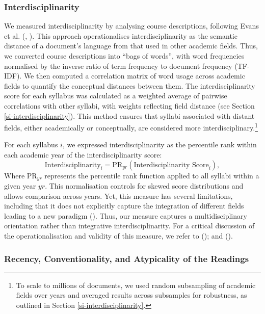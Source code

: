 \documentclass[
  british,
  12pt,
]{article}
\begin{document}
\subsubsection{Interdisciplinarity}\label{interdisciplinarity}

We measured interdisciplinarity by analysing course descriptions, following Evans et al. (, ). This approach operationalises interdisciplinarity as the semantic distance of a document's language from that used in other academic fields. Thus, we converted course descriptions into ``bags of words'', with word frequencies normalised by the inverse ratio of term frequency to document frequency (TF-IDF). We then computed a correlation matrix of word usage across academic fields to quantify the conceptual distances between them. The interdisciplinarity score for each syllabus was calculated as a weighted average of pairwise correlations with other syllabi, with weights reflecting field distance (see Section \ref{si-interdisciplinarity}). This method ensures that syllabi associated with distant fields, either academically or conceptually, are considered more interdisciplinary.\footnote{
  To scale to millions of documents, we used random subsampling of academic fields over years and averaged results across subsamples for robustness, as outlined in Section \ref{si-interdisciplinarity}.}

For each syllabus \(i\), we expressed interdisciplinarity as the percentile rank within each academic year of the interdisciplinarity score:
\[
  \text{Interdisciplinarity}_i = 
  \text{PR}_{yr} (\text{Interdisciplinarity Score}_i),
\]
Where \(\text{PR}_{yr}\) represents the percentile rank function applied to all syllabi within a given year \(yr\). This normalisation controls for skewed score distributions and allows comparison across years.
Yet, this measure has several limitations, including that it does not explicitly capture the integration of different fields leading to a new paradigm (). Thus, our measure captures a multidisciplinary orientation rather than integrative interdisciplinarity. For a critical discussion of the operationalisation and validity of this measure, we refer to (); and ().

\subsubsection{Recency, Conventionality, and Atypicality of the Readings}\label{recency-conventionality-and-atypicality-of-the-readings}
\end{document}
